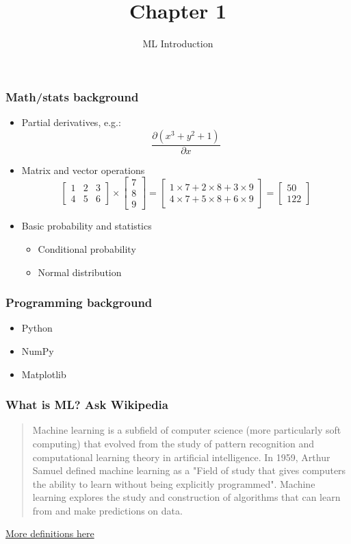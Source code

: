 \documentclass{beamer}
\title{Chapter 1}
\subtitle{ML Introduction}
\begin{document}
\maketitle

\begin{frame}
  \frametitle{Math/stats background}
  \begin{itemize}
  \item Partial derivatives, e.g.: \\
    \[
    \frac{\partial (x^3 + y^2 + 1)}{\partial x}
    \]
  \item Matrix and vector operations \\
    \[
    \begin{bmatrix}
      1 & 2  & 3\\
      4 & 5  & 6
    \end{bmatrix} \times  \begin{bmatrix}
      7 \\
      8 \\
      9
    \end{bmatrix} =  \begin{bmatrix}
      1 \times 7 + 2 \times 8 + 3 \times 9 \\
      4 \times 7 + 5 \times 8 + 6 \times 9
    \end{bmatrix} = \begin{bmatrix}
      50 \\
      122
    \end{bmatrix}
    \]
  \item Basic probability and statistics
    \begin{itemize}
    \item Conditional probability
    \item Normal distribution
    \end{itemize}
  \end{itemize}
\end{frame}

\begin{frame}
  \frametitle{Programming background}
  \begin{itemize}
  \item Python
  \item NumPy
  \item Matplotlib
  \end{itemize}
\end{frame}

\begin{frame}
  \frametitle{What is ML? Ask Wikipedia}
  \begin{quote}
    Machine learning is a subfield of computer science (more particularly soft computing) that evolved from the study of pattern recognition and computational learning theory in artificial intelligence. In 1959, Arthur Samuel defined machine learning as a "Field of study that gives computers the ability to learn without being explicitly programmed". Machine learning explores the study and construction of algorithms that can learn from and make predictions on data.
  \end{quote}
  \href{http://machinelearningmastery.com/what-is-machine-learning/}{More definitions here}
\end{frame}
\end{document}
